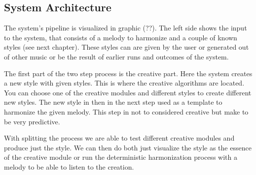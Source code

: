 \subsection{System Architecture}
The system's pipeline is visualized in graphic (??). The left side shows the input to the system, that consists of a melody to harmonize  and a couple of known styles (see next chapter).
These styles can are given by the user or generated out of other music or be the result of earlier runs and outcomes of the system.

The first part of the two step process is the creative part. Here the system creates a new style with given styles. This is where the creative algorithms are located. You can choose one of the creative modules and different styles to create different new styles. The new style in then in the next step used as a template to harmonize the given melody. This step in not to considered creative but make to be very predictive.

With splitting the process we are able to test different creative modules and produce just the style. We can then do both just visualize the style as the essence of the creative module or run the deterministic harmonization process with a melody to be able to listen to the creation. 